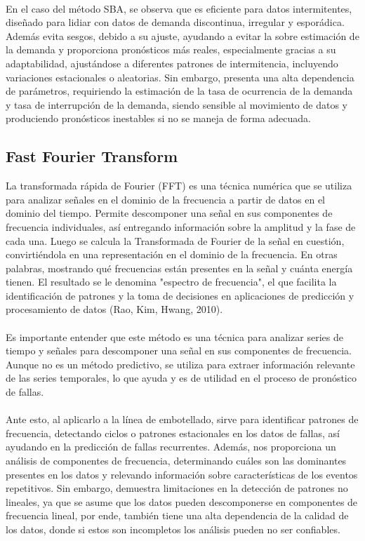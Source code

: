\documentclass[10pt]{article}
\begin{document}
\\
En el caso del método SBA, se observa que es eficiente para datos intermitentes, diseñado para lidiar con datos de demanda discontinua, irregular y esporádica. Además evita sesgos, debido a su ajuste, ayudando a evitar la sobre estimación de la demanda y proporciona pronósticos más reales, especialmente gracias a su adaptabilidad, ajustándose a diferentes patrones de intermitencia, incluyendo variaciones estacionales o aleatorias. Sin embargo, presenta una alta dependencia de parámetros, requiriendo la estimación de la tasa de ocurrencia de la demanda y tasa de interrupción de la demanda, siendo sensible al movimiento de datos y produciendo pronósticos inestables si no se maneja de forma adecuada.

\subsection{Fast Fourier Transform}
La transformada rápida de Fourier (FFT) es una técnica numérica que se utiliza para analizar señales en el dominio de la frecuencia a partir de datos en el dominio del tiempo. Permite descomponer una señal en sus componentes de frecuencia individuales, así entregando información sobre la amplitud y la fase de cada una. Luego se calcula la Transformada de Fourier de la señal en cuestión, convirtiéndola en una representación en el dominio de la frecuencia. En otras palabras, mostrando qué frecuencias están presentes en la señal y cuánta energía tienen. El resultado se le denomina "espectro de frecuencia", el que facilita la identificación de patrones y la toma de decisiones en aplicaciones de predicción y procesamiento de datos (Rao, Kim, Hwang, 2010).\\
\\
Es importante entender que este método es una técnica para analizar series de tiempo y señales para descomponer una señal en sus componentes de frecuencia. Aunque no es un método predictivo, se utiliza para extraer información relevante de las series temporales, lo que ayuda y es de utilidad en el proceso de pronóstico de fallas.\\
\\
Ante esto, al aplicarlo a la línea de embotellado, sirve para identificar patrones de frecuencia, detectando ciclos o patrones estacionales en los datos de fallas, así ayudando en la predicción de fallas recurrentes. Además, nos proporciona un análisis de componentes de frecuencia, determinando cuáles son las dominantes presentes en los datos y relevando información sobre características de los eventos repetitivos. Sin embargo, demuestra limitaciones en la detección de patrones no lineales, ya que se asume que los datos pueden descomponerse en componentes de frecuencia lineal, por ende, también tiene una alta dependencia de la calidad de los datos, donde si estos son incompletos los análisis pueden no ser confiables.
\end{document}
